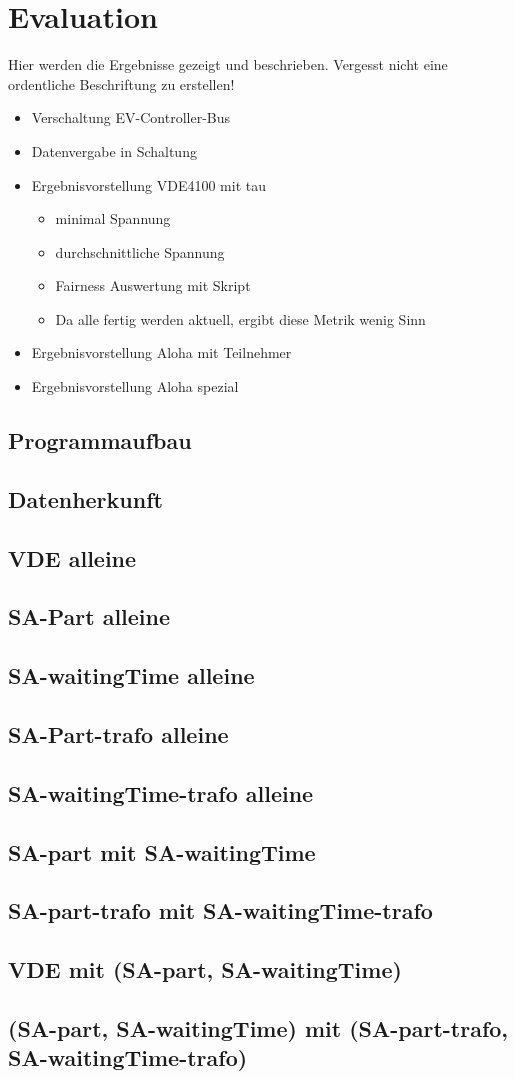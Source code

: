 \chapter{Evaluation}
Hier werden die Ergebnisse gezeigt und beschrieben. Vergesst nicht eine ordentliche Beschriftung zu erstellen!

\begin{itemize}
\item Verschaltung EV-Controller-Bus
\item Datenvergabe in Schaltung
\item Ergebnisvorstellung VDE4100 mit tau
\begin{itemize}
\item minimal Spannung
\item durchschnittliche Spannung
\item Fairness Auswertung mit Skript
\item Da alle fertig werden aktuell, ergibt diese Metrik wenig Sinn
\end{itemize}
\item Ergebnisvorstellung Aloha mit Teilnehmer
\item Ergebnisvorstellung Aloha spezial

\end{itemize}

\section{Programmaufbau}
\section{Datenherkunft}
\section{VDE alleine}
\section{SA-Part alleine}
\section{SA-waitingTime alleine}
\section{SA-Part-trafo alleine}
\section{SA-waitingTime-trafo alleine}
\section{SA-part mit SA-waitingTime}
\section{SA-part-trafo mit SA-waitingTime-trafo}
\section{VDE mit (SA-part, SA-waitingTime)}
\section{(SA-part, SA-waitingTime) mit (SA-part-trafo, SA-waitingTime-trafo)}
